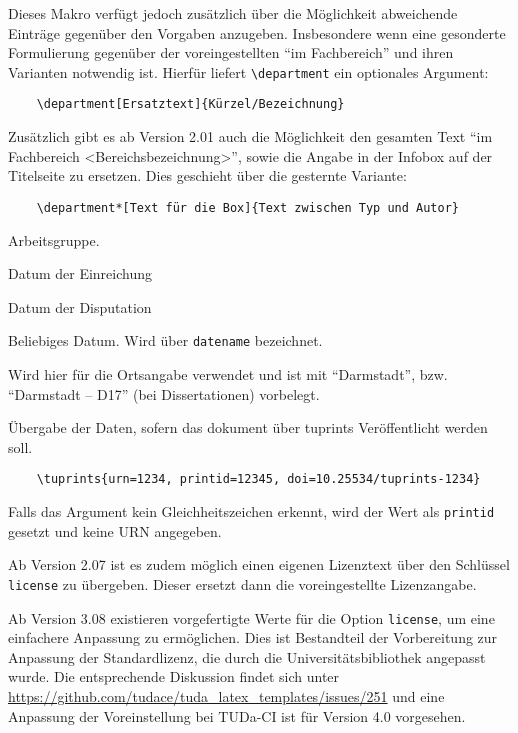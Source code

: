 \documentclass[
	ngerman,
	ruledheaders=section,%
	class=report,%
	thesis={type=bachelor},%
	accentcolor=9c,%
	custommargins=true,%
	marginpar=false,%
	parskip=half-,%
	fontsize=11pt,%
]{tudapub}
\let\code\texttt
\begin{document}
\begin{description}
	Dieses Makro verfügt jedoch zusätzlich über die Möglichkeit abweichende Einträge gegenüber den Vorgaben anzugeben. Insbesondere wenn eine gesonderte Formulierung gegenüber der voreingestellten \enquote{im Fachbereich} und ihren Varianten notwendig ist. Hierfür liefert \code{\textbackslash{}department} ein optionales Argument:

	\begin{verbatim}
	\department[Ersatztext]{Kürzel/Bezeichnung}
	\end{verbatim}
	Zusätzlich gibt es ab Version 2.01 auch die Möglichkeit den gesamten Text \enquote{im Fachbereich <Bereichsbezeichnung>}, sowie die Angabe in der Infobox auf der Titelseite zu ersetzen. Dies geschieht über die gesternte Variante:
	\begin{verbatim}
	\department*[Text für die Box]{Text zwischen Typ und Autor}
	\end{verbatim}
	\item[group] Arbeitsgruppe.
	\item[submissiondate] Datum der Einreichung
	\item[examdate] Datum der Disputation
	\item[date] Beliebiges Datum. Wird über \verb|datename| bezeichnet.
	\item[publishers] Wird hier für die Ortsangabe verwendet und ist mit \enquote{Darmstadt}, bzw. \enquote{Darmstadt -- D17} (bei Dissertationen) vorbelegt.
	\item[tuprints] \label{page:tuprints}Übergabe der Daten, sofern das dokument über tuprints Veröffentlicht werden soll.
	\begin{verbatim}
	\tuprints{urn=1234, printid=12345, doi=10.25534/tuprints-1234}
	\end{verbatim}
	Falls das Argument kein Gleichheitszeichen erkennt, wird der Wert als \code{printid} gesetzt und keine URN angegeben.

	Ab Version 2.07 ist es zudem möglich einen eigenen Lizenztext über den Schlüssel \verb|license| zu übergeben. Dieser ersetzt dann die voreingestellte Lizenzangabe.

	Ab Version 3.08 existieren vorgefertigte Werte für die Option \verb|license|, um eine einfachere Anpassung zu ermöglichen.
	Dies ist Bestandteil der Vorbereitung zur Anpassung der Standardlizenz, die durch die Universitätsbibliothek angepasst wurde.
	Die entsprechende Diskussion findet sich unter \url{https://github.com/tudace/tuda_latex_templates/issues/251} und eine Anpassung der Voreinstellung bei TUDa-CI ist für Version 4.0 vorgesehen.


\end{description}
\end{document}
